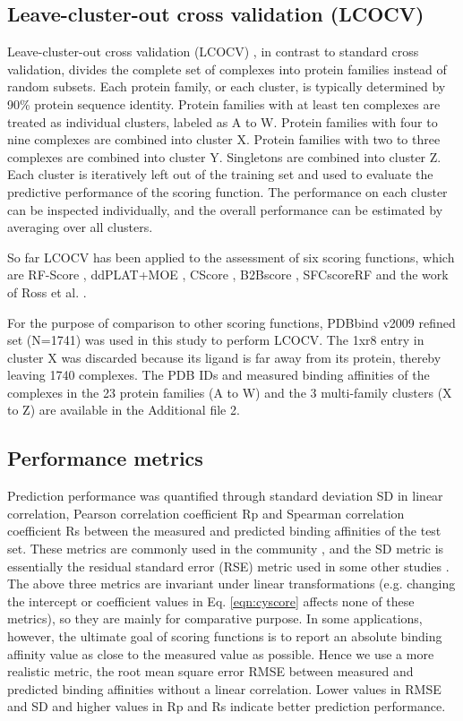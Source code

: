 \documentclass[twocolumn]{bmcart}
\begin{document}
\subsection*{Leave-cluster-out cross validation (LCOCV)}

Leave-cluster-out cross validation (LCOCV) \cite{774}, in contrast to standard cross validation, divides the complete set of complexes into protein families instead of random subsets. Each protein family, or each cluster, is typically determined by 90\% protein sequence identity. Protein families with at least ten complexes are treated as individual clusters, labeled as A to W. Protein families with four to nine complexes are combined into cluster X. Protein families with two to three complexes are combined into cluster Y. Singletons are combined into cluster Z. Each cluster is iteratively left out of the training set and used to evaluate the predictive performance of the scoring function. The performance on each cluster can be inspected individually, and the overall performance can be estimated by averaging over all clusters.

So far LCOCV has been applied to the assessment of six scoring functions, which are RF-Score \cite{774,1194,1410}, ddPLAT+MOE \cite{1414}, CScore \cite{1194}, B2Bscore \cite{1410}, SFCscoreRF \cite{1347} and the work of Ross et al. \cite{1415}.

For the purpose of comparison to other scoring functions, PDBbind v2009 refined set (N=1741) was used in this study to perform LCOCV. The 1xr8 entry in cluster X was discarded because its ligand is far away from its protein, thereby leaving 1740 complexes. The PDB IDs and measured binding affinities of the complexes in the 23 protein families (A to W) and the 3 multi-family clusters (X to Z) are available in the Additional file 2.

\subsection*{Performance metrics}

Prediction performance was quantified through standard deviation SD in linear correlation, Pearson correlation coefficient Rp and Spearman correlation coefficient Rs between the measured and predicted binding affinities of the test set. These metrics are commonly used in the community \cite{1313}, and the SD metric is essentially the residual standard error (RSE) metric used in some other studies \cite{963}. The above three metrics are invariant under linear transformations (e.g. changing the intercept or coefficient values in Eq. \ref{eqn:cyscore} affects none of these metrics), so they are mainly for comparative purpose. In some applications, however, the ultimate goal of scoring functions is to report an absolute binding affinity value as close to the measured value as possible. Hence we use a more realistic metric, the root mean square error RMSE between measured and predicted binding affinities without a linear correlation. Lower values in RMSE and SD and higher values in Rp and Rs indicate better prediction performance.
\end{document}
